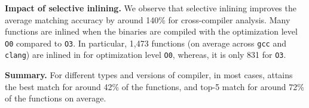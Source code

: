 \noindent\textbf{Impact of selective inlining.}  We observe that selective inlining improves the average matching accuracy by around 140\% for cross-compiler analysis. Many functions are inlined when the binaries are compiled with the optimization level \texttt{O0} compared to \texttt{O3}. In particular, 1,473 functions (on average across \texttt{gcc} and \texttt{clang}) are inlined in for optimization level \texttt{O0}, whereas, it is only 831 for \texttt{O3}.

\noindent\textbf{Summary.} %
For different types and versions of compiler, in most cases, \tool attains the best match for around 42\% of the functions, and top-5 match for around 72\% of the functions on average.

